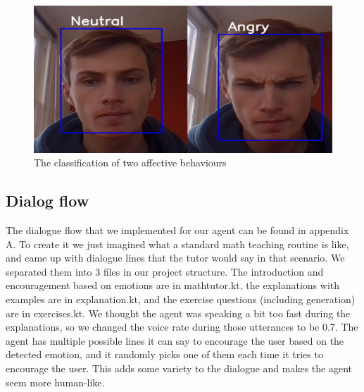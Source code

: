 \begin{figure}[h]
\centering
\includegraphics[width=\linewidth]{images/neutral_angry.png}
\caption{The classification of two affective behaviours}
\label{fig:emotion_detection}
\end{figure}

\subsection{Dialog flow}
The dialogue flow that we implemented for our agent can be found in appendix A. To create it we just imagined what a standard math teaching routine is like, and came up with dialogue lines that the tutor would say in that scenario. We separated them into 3 files in our project structure. The introduction and encouragement based on emotions are in mathtutor.kt, the explanations with examples are in explanation.kt, and the exercise questions (including generation) are in exercises.kt. We thought the agent was speaking a bit too fast during the explanations, so we changed the voice rate during those utterances to be 0.7. The agent has multiple possible lines it can say to encourage the user based on the detected emotion, and it randomly picks one of them each time it tries to encourage the user. This adds some variety to the dialogue and makes the agent seem more human-like. 

